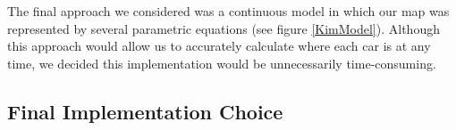 \documentclass[11pt]{article}
\begin{document}
	The final approach we considered was a continuous model in which our map was represented by several parametric equations (see figure \ref{KimModel}). 
	Although this approach would allow us to accurately calculate where each car is at any time, we decided this implementation would be unnecessarily time-consuming.  
	

\subsection{Final Implementation Choice}

	
	
	
\end{document}
